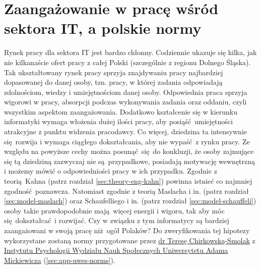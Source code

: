 \section{Zaangażowanie w pracę wśród sektora IT, a polskie normy}
Rynek pracy dla sektora IT jest bardzo chłonny. Codziennie ukazuje się kilka, jak nie kilkanaście ofert pracy z całej Polski (szczególnie z regionu Dolnego Śląska). Tak ukształtowany rynek pracy sprzyja znajdywaniu pracy najbardziej dopasowanej do danej osoby, tzn. pracy, w której zadania odpowiadają zdolnościom, wiedzy i umiejętnościom danej osoby. Odpowiednia praca sprzyja wigorowi w pracy, absorpcji podczas wykonywania zadania oraz oddaniu, czyli wszystkim aspektom zaangażowania. Dodatkowo kształcenie
się w kierunku informatyki wymaga włożenia dużej ilości pracy, aby posiąść umiejętności atrakcyjne z punktu widzenia pracodawcy. Co więcej, dziedzina ta intensywnie się rozwija i wymaga ciągłego dokształcania, aby nie wypaść z rynku pracy. Ze względu na powyższe cechy można posunąć się do konkluzji, że osoby zajmujące się tą dziedziną zazwyczaj nie są przypadkowe, posiadają motywację wewnętrzną i możemy mówić o odpowiedniości pracy w ich przypadku. Zgodnie z teorią Kahna (patrz
rozdział \ref{sec:theory-eng-kahn}) powinna istnieć co najmniej zgodność poznawcza. Natomiast zgodnie z teorią Maslacha i in. (patrz rozdział \ref{sec:model-maslach}) oraz Schaufelliego i in. (patrz rozdział \ref{sec:model-schauffeli}) osoby takie prawdopodobnie mają więcej energii i wigoru, tak aby móc się dokształcać i rozwijać. Czy w związku z tym informatycy są bardziej zaangażowani w swoją pracę
niż ogół Polaków? Do zweryfikowania tej hipotezy wykorzystane zostaną normy przygotowane przez \href{http://www.psychologia.amu.edu.pl/ip-uam/struktura-zatrudnienia-w-instytucie/curriculum-vitae-teresa-chirkowska-smolak/}{dr Teresę Chirkowską-Smolak} z \href{http://www.psychologia.amu.edu.pl/}{Instytutu Psychologii Wydziału Nauk Społecznych Uniwersytetu Adama Mickiewicza} (\ref{sec:app-uwes-norms}). 
